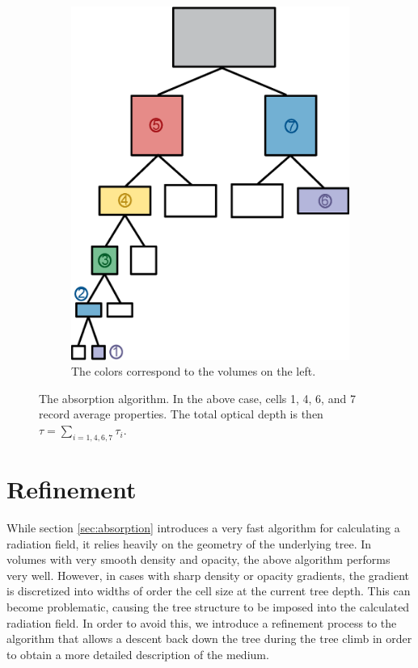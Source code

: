 \begin{figure}
\begin{subfigure}[b]{0.45\textwidth}
                \includegraphics[width=\textwidth]{graphics/RT_tree.eps}
                \caption{The colors correspond to the volumes on the left.}
                \label{fig:absorptiontree}
        \end{subfigure}
        \caption[The absorption algorithm.]{The absorption algorithm. In the above case, cells 1, 4, 6, and 7 record average properties. The total optical depth is then $\tau = \sum_{i=1,4,6,7}\tau_i$.}
        \label{fig:absorption}
\end{figure}



\section{Refinement}
\label{sec:refinement}

While section \ref{sec:absorption} introduces a very fast algorithm for calculating a radiation field, it relies heavily on the geometry of the underlying tree. In volumes with very smooth density and opacity, the above algorithm performs very well. However, in cases with sharp density or opacity gradients, the gradient is discretized into widths of order the cell size at the current tree depth. This can become problematic, causing the tree structure to be imposed into the calculated radiation field. In order to avoid this, we introduce a refinement process to the algorithm that allows a descent back down the tree during the tree climb in order to obtain a more detailed description of the medium.

